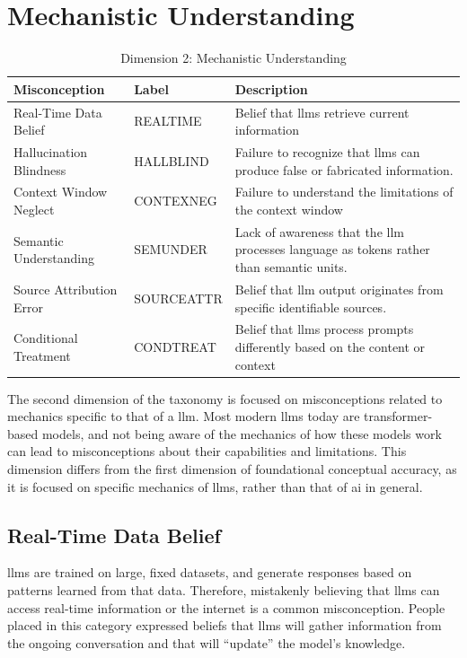 \section{Mechanistic Understanding}
\begin{table}[htbp]
\centering
\caption{Dimension 2: Mechanistic Understanding}\label{dim2}
\begin{tabularx}{\textwidth}{|l|l|X|}
\hline
\textbf{Misconception} & \textbf{Label} & \textbf{Description} \\
\hline
Real-Time Data Belief & REALTIME & Belief that \gls{llms} retrieve current information \\
\hline
Hallucination Blindness & HALLBLIND & Failure to recognize that \gls{llms} can produce false or fabricated information. \\
\hline
Context Window Neglect & CONTEXNEG & Failure to understand the limitations of the context window \\
\hline
Semantic Understanding & SEMUNDER & Lack of awareness that the \gls{llm} processes language as tokens rather than semantic units. \\
\hline
Source Attribution Error & SOURCEATTR & Belief that \gls{llm} output originates from specific identifiable sources. \\
\hline
Conditional Treatment & CONDTREAT & Belief that \gls{llms} process prompts differently based on the content or context \\
\hline
\end{tabularx}
\end{table}
The second dimension of the taxonomy is focused on misconceptions related to mechanics specific to that of a \gls{llm}. Most modern \gls{llms} today are transformer-based models, and not being aware of the mechanics of how these models work can lead to misconceptions about their capabilities and limitations. This dimension differs from the first dimension of foundational conceptual accuracy, as it is focused on specific mechanics of \gls{llms}, rather than that of \gls{ai} in general.

\subsection{Real-Time Data Belief}\label{realtime}
\gls{llms} are trained on large, fixed datasets, and generate responses based on patterns learned from that data. Therefore, mistakenly believing that \gls{llms} can access real-time information or the internet is a common misconception. People placed in this category expressed beliefs that \gls{llms} will gather information from the ongoing conversation and that will ``update'' the model's knowledge. 

